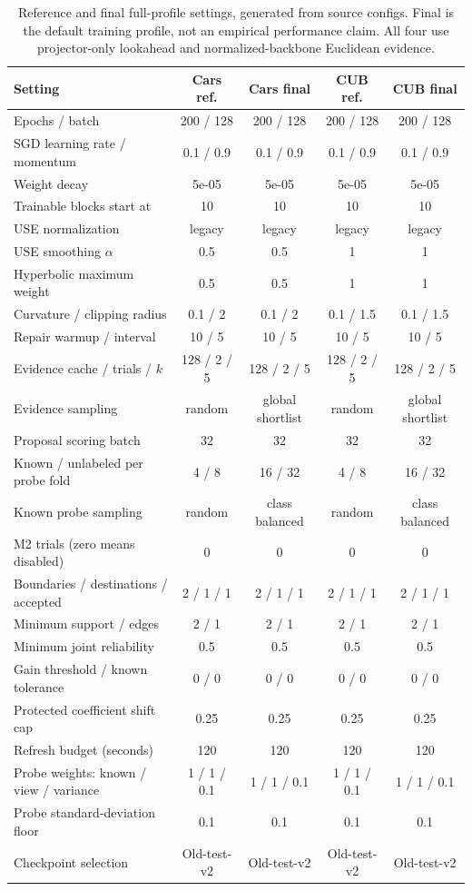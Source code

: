 \documentclass[conference]{IEEEtran}
\begin{document}
\begin{table}[!t]\footnotesize\centering
\caption{Reference and final full-profile settings, generated from source configs. Final is the default training profile, not an empirical performance claim. All four use projector-only lookahead and normalized-backbone Euclidean evidence.}
\begin{tabularx}{\textwidth}{@{}Xcccc@{}}\toprule
Setting & Cars ref. & Cars final & CUB ref. & CUB final\\\midrule
Epochs / batch & 200 / 128 & 200 / 128 & 200 / 128 & 200 / 128\\
SGD learning rate / momentum & 0.1 / 0.9 & 0.1 / 0.9 & 0.1 / 0.9 & 0.1 / 0.9\\
Weight decay & 5e-05 & 5e-05 & 5e-05 & 5e-05\\
Trainable blocks start at & 10 & 10 & 10 & 10\\
USE normalization & legacy & legacy & legacy & legacy\\
USE smoothing $\alpha$ & 0.5 & 0.5 & 1 & 1\\
Hyperbolic maximum weight & 0.5 & 0.5 & 1 & 1\\
Curvature / clipping radius & 0.1 / 2 & 0.1 / 2 & 0.1 / 1.5 & 0.1 / 1.5\\
Repair warmup / interval & 10 / 5 & 10 / 5 & 10 / 5 & 10 / 5\\
Evidence cache / trials / $k$ & 128 / 2 / 5 & 128 / 2 / 5 & 128 / 2 / 5 & 128 / 2 / 5\\
Evidence sampling & random & global shortlist & random & global shortlist\\
Proposal scoring batch & 32 & 32 & 32 & 32\\
Known / unlabeled per probe fold & 4 / 8 & 16 / 32 & 4 / 8 & 16 / 32\\
Known probe sampling & random & class balanced & random & class balanced\\
M2 trials (zero means disabled) & 0 & 0 & 0 & 0\\
Boundaries / destinations / accepted & 2 / 1 / 1 & 2 / 1 / 1 & 2 / 1 / 1 & 2 / 1 / 1\\
Minimum support / edges & 2 / 1 & 2 / 1 & 2 / 1 & 2 / 1\\
Minimum joint reliability & 0.5 & 0.5 & 0.5 & 0.5\\
Gain threshold / known tolerance & 0 / 0 & 0 / 0 & 0 / 0 & 0 / 0\\
Protected coefficient shift cap & 0.25 & 0.25 & 0.25 & 0.25\\
Refresh budget (seconds) & 120 & 120 & 120 & 120\\
Probe weights: known / view / variance & 1 / 1 / 0.1 & 1 / 1 / 0.1 & 1 / 1 / 0.1 & 1 / 1 / 0.1\\
Probe standard-deviation floor & 0.1 & 0.1 & 0.1 & 0.1\\
Checkpoint selection & Old-test-v2 & Old-test-v2 & Old-test-v2 & Old-test-v2\\
\bottomrule\end{tabularx}\label{tab:settings}
\end{table}
\end{document}
